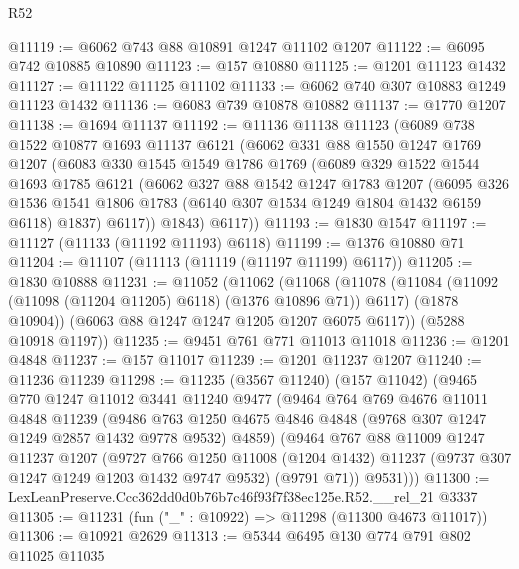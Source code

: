 \begin{lexlean}{R52}
\begin{coremodule}
@11119 := @6062 @743 @88 @10891 @1247 @11102 @1207
@11122 := @6095 @742 @10885 @10890
@11123 := @157 @10880
@11125 := @1201 @11123 @1432
@11127 := @11122 @11125 @11102
@11133 := @6062 @740 @307 @10883 @1249 @11123 @1432
@11136 := @6083 @739 @10878 @10882
@11137 := @1770 @1207
@11138 := @1694 @11137
@11192 := @11136
    @11138
    @11123
    (@6089
      @738
      @1522
      @10877
      @1693
      @11137
      @6121
      (@6062
        @331
        @88
        @1550
        @1247
        @1769
        @1207
        (@6083
          @330
          @1545
          @1549
          @1786
          @1769
          (@6089
            @329
            @1522
            @1544
            @1693
            @1785
            @6121
            (@6062
              @327
              @88
              @1542
              @1247
              @1783
              @1207
              (@6095
                @326
                @1536
                @1541
                @1806
                @1783
                (@6140 @307 @1534 @1249 @1804 @1432 @6159 @6118)
                @1837)
              @6117))
          @1843)
        @6117))
@11193 := @1830 @1547
@11197 := @11127 (@11133 (@11192 @11193) @6118)
@11199 := @1376 @10880 @71
@11204 := @11107 (@11113 (@11119 (@11197 @11199) @6117))
@11205 := @1830 @10888
@11231 := @11052
    (@11062
      (@11068
        (@11078
          (@11084 (@11092 (@11098 (@11204 @11205) @6118) (@1376 @10896 @71)) @6117)
          (@1878 @10904))
        (@6063 @88 @1247 @1247 @1205 @1207 @6075 @6117))
      (@5288 @10918 @1197))
@11235 := @9451 @761 @771 @11013 @11018
@11236 := @1201 @4848
@11237 := @157 @11017
@11239 := @1201 @11237 @1207
@11240 := @11236 @11239
@11298 := @11235
    (@3567 @11240)
    (@157 @11042)
    (@9465
      @770
      @1247
      @11012
      @3441
      @11240
      @9477
      (@9464
        @764
        @769
        @4676
        @11011
        @4848
        @11239
        (@9486 @763 @1250 @4675 @4846 @4848 (@9768 @307 @1247 @1249 @2857 @1432 @9778 @9532) @4859)
        (@9464
          @767
          @88
          @11009
          @1247
          @11237
          @1207
          (@9727
            @766
            @1250
            @11008
            (@1204 @1432)
            @11237
            (@9737 @307 @1247 @1249 @1203 @1432 @9747 @9532)
            (@9791 @71))
          @9531)))
@11300 := LexLeanPreserve.Ccc362dd0d0b76b7c46f93f7f38ec125e.R52.__rel_21 @3337
@11305 := @11231 (fun ("_" : @10922) => @11298 (@11300 @4673 @11017))
@11306 := @10921 @2629
@11313 := @5344 @6495 @130 @774 @791 @802 @11025 @11035

\end{coremodule}
\end{lexlean}

